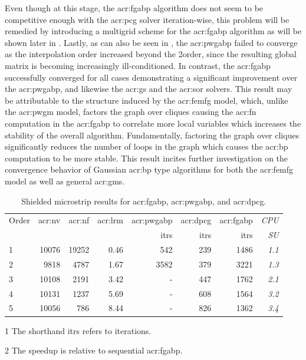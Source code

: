 Even though at this stage, the \gls{acr:fgabp} algorithm does not seem to be competitive enough with the \gls{acr:pcg} solver iteration-wise, this problem will be remedied by introducing a multigrid scheme for the \gls{acr:fgabp} algorithm as will be shown later in . 
Lastly, as can also be seen in , the \gls{acr:pwgabp} failed to converge as the interpolation order increased beyond the 2\ssnd order, since the resulting global matrix is becoming increasingly ill-conditioned.
In contrast, the \gls{acr:fgabp} successfully converged for all cases demonstrating a significant improvement over the \gls{acr:pwgabp}, and likewise the \gls{acr:gs} and the \gls{acr:sor} solvers.
This result may be attributable to the structure induced by the \gls{acr:femfg} model, which, unlike the \gls{acr:pwgm} model, factors the graph over cliques causing the \gls{acr:fn} computation in the \gls{acr:fgabp} to correlate more local variables which increases the stability of the overall algorithm.
Fundamentally, factoring the graph over cliques significantly reduces the number of loops in the graph which causes the \gls{acr:bp} computation to be more stable.
This result incites further investigation on the convergence behavior of Gaussian \gls{acr:bp} type algorithms for both the \gls{acr:femfg} model as well as general \glspl{acr:gm}.


\begin{table}[h]
	\centering
	\caption{Shielded microstrip results for \acrshort{acr:fgabp}, \acrshort{acr:pwgabp}, and \acrshort{acr:dpcg}.} \label{tbl:FGaBPRes}
	\begin{threeparttable}[c]
		\begin{tabular}{l r r r r r r>{\itshape} r}
			\toprule
			Order & \gls{acr:nv} & \gls{acr:nf} & \gls{acr:lrm} & \gls{acr:pwgabp} & \gls{acr:dpcg} & \gls{acr:fgabp} & CPU \tabularnewline
			&              &              &               & itrs \tnote{1}   & itrs           & itrs            & SU \tnote{2} \tabularnewline
			\midrule
			1\ssst & 10076 & 19252 & 0.46 & 542  & 239 & 1486 & 1.1 \tabularnewline
			2\ssnd & 9818  & 4787  & 1.67 & 3582 & 379 & 3221 & 1.3 \tabularnewline
			3\ssrd & 10108 & 2191  & 3.42 & -    & 447 & 1762 & 2.1 \tabularnewline
			4\ssth & 10131 & 1237  & 5.69 & -    & 608 & 1564 & 3.2 \tabularnewline
			5\ssth & 10056 & 786   & 8.44 & -    & 826 & 1362 & 3.4 \tabularnewline
			\bottomrule
		\end{tabular}
		\begin{tablenotes}
			\begin{footnotesize}
			\item[1] {\footnotesize The shorthand itrs refers to iterations.}
			\item[2] {\footnotesize The speedup is relative to sequential \gls{acr:fgabp}.}
			\end{footnotesize}
		\end{tablenotes}
	\end{threeparttable}
\end{table}


